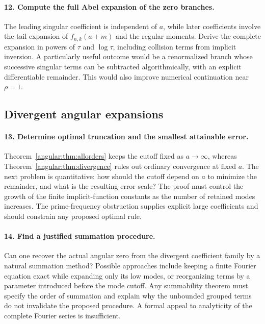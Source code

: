 \documentclass[11pt,a4paper]{article}
\theoremstyle{definition}
\theoremstyle{remark}
\numberwithin{equation}{section}
\begin{document}
\paragraph{12. Compute the full Abel expansion of the zero branches.}
The leading singular coefficient is independent of $a$, while later
coefficients involve the tail expansion of $f_{n,k}(a+m)$ and the
regular moments. Derive the complete expansion in powers of $\tau$
and $\log\tau$, including collision terms from implicit inversion.
A particularly useful outcome would be a renormalized branch whose
successive singular terms can be subtracted algorithmically, with an
explicit differentiable remainder. This would also improve numerical
continuation near $\rho=1$.

\subsection{Divergent angular expansions}

\paragraph{13. Determine optimal truncation and the smallest attainable error.}
Theorem~\ref{angular:thm:allorders} keeps the cutoff fixed as
$a\to\infty$, whereas Theorem~\ref{angular:thm:divergence} rules out
ordinary convergence at fixed $a$. The next problem is quantitative:
how should the cutoff depend on $a$ to minimize the remainder, and
what is the resulting error scale? The proof must control the growth
of the finite implicit-function constants as the number of retained
modes increases. The prime-frequency obstruction supplies explicit
large coefficients and should constrain any proposed optimal rule.

\paragraph{14. Find a justified summation procedure.}
Can one recover the actual angular zero from the divergent coefficient
family by a natural summation method? Possible approaches include
keeping a finite Fourier equation exact while expanding only its low
modes, or reorganizing terms by a parameter introduced before the
mode cutoff. Any summability theorem must specify the order of
summation and explain why the unbounded grouped terms do not invalidate
the proposed procedure. A formal appeal to analyticity of the complete
Fourier series is insufficient.
\end{document}
